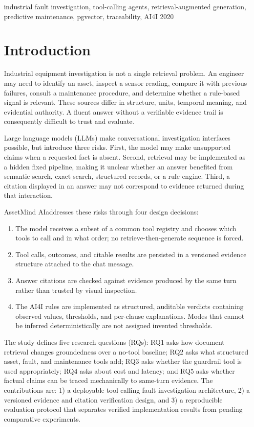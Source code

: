 \documentclass[conference]{IEEEtran}
\newcommand{\system}{AssetMind AI}
\begin{document}
\begin{IEEEkeywords}
industrial fault investigation, tool-calling agents, retrieval-augmented
generation, predictive maintenance, pgvector, traceability, AI4I 2020
\end{IEEEkeywords}

\section{Introduction}
Industrial equipment investigation is not a single retrieval problem. An
engineer may need to identify an asset, inspect a sensor reading, compare it
with previous failures, consult a maintenance procedure, and determine
whether a rule-based signal is relevant. These sources differ in structure,
units, temporal meaning, and evidential authority. A fluent answer without a
verifiable evidence trail is consequently difficult to trust and evaluate.

Large language models (LLMs) make conversational investigation interfaces
possible, but introduce three risks. First, the model may make unsupported
claims when a requested fact is absent. Second, retrieval may be implemented
as a hidden fixed pipeline, making it unclear whether an answer benefited
from semantic search, exact search, structured records, or a rule engine.
Third, a citation displayed in an answer may not correspond to evidence
returned during that interaction.

\system addresses these risks through four design decisions:
\begin{enumerate}
\item The model receives a subset of a common tool registry and chooses
which tools to call and in what order; no retrieve-then-generate sequence is
forced.
\item Tool calls, outcomes, and citable results are persisted in a versioned
evidence structure attached to the chat message.
\item Answer citations are checked against evidence produced by the same
turn rather than trusted by visual inspection.
\item The AI4I rules are implemented as structured, auditable verdicts
containing observed values, thresholds, and per-clause explanations. Modes
that cannot be inferred deterministically are not assigned invented
thresholds.
\end{enumerate}

The study defines five research questions (RQs): RQ1 asks how document
retrieval changes groundedness over a no-tool baseline; RQ2 asks what
structured asset, fault, and maintenance tools add; RQ3 asks whether the
guardrail tool is used appropriately; RQ4 asks about cost and latency; and
RQ5 asks whether factual claims can be traced mechanically to same-turn
evidence. The contributions are: 1) a deployable tool-calling
fault-investigation architecture, 2) a versioned evidence and citation
verification design, and 3) a reproducible evaluation protocol that separates
verified implementation results from pending comparative experiments.
\end{document}
